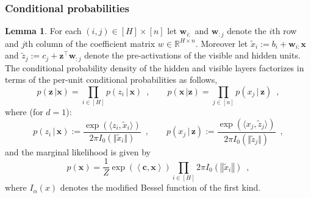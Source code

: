 \documentclass[12pt]{article}
\theoremstyle{definition}%
\newtheorem{lem}[thm]{Lemma}
\theoremstyle{definition}
\theoremstyle{remark}
\begin{document}
\subsubsection{Conditional probabilities}
\begin{lem}\label{prop:conditional}
For each $(i,j) \in [H] \times [n]$ let $\bm{w}_{i\bm{:}}$ and $\bm{w}_{\bm{:}j}$ denote the $i$th row and $j$th column of the coefficient matrix $w \in \mathbb{R}^{H \times n}$. Moreover let $\tilde{x}_i := b_i + \bm{w}_{i\bm{:}} \bm{x}$ and $\tilde{z}_j := c_j + \bm{z}^\top \bm{w}_{\bm{:}j}$ denote the pre-activations of the visible and hidden units.
The conditional probability density of the hidden and visible layers factorizes in terms of the per-unit conditional probabilities as follows,
\begin{equation}
	p(\bm{z} \, | \bm{x}) = \prod_{i\in[H]} p(z_i \, | \, \bm{x}) \enspace , \quad \quad 	p(\bm{x} \, | \bm{z}) = \prod_{j\in[n]} p(x_j \, | \, \bm{z}) \enspace ,
\end{equation}
where (for $d=1$):
\begin{equation}
	p(z_i \, | \, \bm{x}) := \frac{\exp (\langle z_i, \tilde{x}_i \rangle )}{2 \pi I_0 (\Vert \tilde{x}_i \Vert )} \enspace , \quad \quad p(x_j \, | \, \bm{z}) := \frac{\exp ( \langle x_j, \tilde{z}_j \rangle )}{2 \pi I_0 ( \Vert \tilde{z}_j \Vert )} \enspace ,
\end{equation}
and the marginal likelihood is given by
\begin{equation}
p(\bm{x}) = \frac{1}{Z} \exp\left(\left\langle \bm{c}, \bm{x} \right\rangle \right) \prod_{i\in[H]} 2\pi I_0\left(\left\Vert \tilde{x}_i \right\Vert\right) \enspace ,
\end{equation}
where $I_\alpha(x)$ denotes the modified Bessel function of the first kind.
\end{lem}
\end{document}
